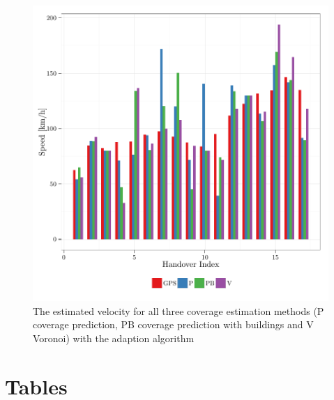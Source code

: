 \documentclass[twocolumn]{bmcart}%
\begin{document}
\begin{backmatter}
\begin{figure}[h!]
\label{fig:velocityadaption}
  \caption{ The estimated velocity for all three coverage estimation methods (P coverage prediction, PB coverage prediction with buildings and V Voronoi) with the adaption algorithm
        }
      \includegraphics[width=0.9\columnwidth]{images/563_SpeedsWithAdaption}
\end{figure}

\section*{Tables}


\end{backmatter}
\end{document}
